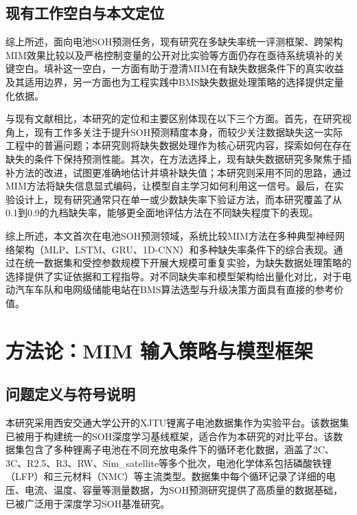 \documentclass[10pt,a4paper]{ctexart}
\begin{document}
\subsection{现有工作空白与本文定位}

综上所述，面向电池SOH预测任务，现有研究在多缺失率统一评测框架、跨架构MIM效果比较以及严格控制变量的公开对比实验等方面仍存在亟待系统填补的关键空白。填补这一空白，一方面有助于澄清MIM在有缺失数据条件下的真实收益及其适用边界，另一方面也为工程实践中BMS缺失数据处理策略的选择提供定量化依据。

与现有文献相比，本研究的定位和主要区别体现在以下三个方面。首先，在研究视角上，现有工作多关注于提升SOH预测精度本身，而较少关注数据缺失这一实际工程中的普遍问题；本研究则将缺失数据处理作为核心研究内容，探索如何在存在缺失的条件下保持预测性能。其次，在方法选择上，现有缺失数据研究多聚焦于插补方法的改进，试图更准确地估计并填补缺失值；本研究则采用不同的思路，通过MIM方法将缺失信息显式编码，让模型自主学习如何利用这一信号。最后，在实验设计上，现有研究通常只在单一或少数缺失率下验证方法，而本研究覆盖了从0.1到0.9的九档缺失率，能够更全面地评估方法在不同缺失程度下的表现。

综上所述，本文首次在电池SOH预测领域，系统比较MIM方法在多种典型神经网络架构（MLP、LSTM、GRU、1D-CNN）和多种缺失率条件下的综合表现。通过在统一数据集和受控参数规模下开展大规模可重复实验，为缺失数据处理策略的选择提供了实证依据和工程指导。对不同缺失率和模型架构给出量化对比，对于电动汽车车队和电网级储能电站在BMS算法选型与升级决策方面具有直接的参考价值。

\section{方法论：MIM 输入策略与模型框架}\label{sec:method}

\subsection{问题定义与符号说明}

本研究采用西安交通大学公开的XJTU锂离子电池数据集作为实验平台\cite{wang2024open,duan2025lithium}。该数据集已被用于构建统一的SOH深度学习基线框架\cite{wang2024open}，适合作为本研究的对比平台。该数据集包含了多种锂离子电池在不同充放电条件下的循环老化数据，涵盖了2C、3C、R2.5、R3、RW、Sim\_satellite等多个批次，电池化学体系包括磷酸铁锂（LFP）和三元材料（NMC）等主流类型。数据集中每个循环记录了详细的电压、电流、温度、容量等测量数据，为SOH预测研究提供了高质量的数据基础，已被广泛用于深度学习SOH基准研究\cite{wang2024pinn}。
\end{document}

